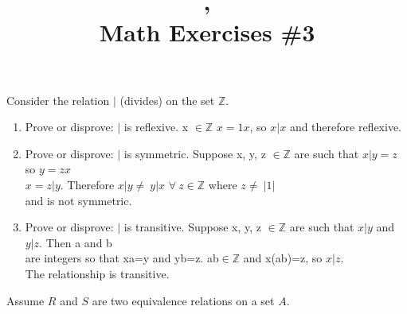 \documentclass{article}
\title{\course, \term\\Math Exercises \#3}
\begin{document}
\maketitle

\question%
%
Consider the relation $|$ (divides) on the set $\mathbb{Z}$.

\begin{enumerate}
\item Prove or disprove: $|$ is reflexive.
\answer \forall x $\in\mathbb{Z}$ $x=1x$, so $x|x$ and therefore reflexive.
\item Prove or disprove: $|$ is symmetric.
\answer Suppose x, y, z $\in\mathbb{Z}$ are such that $x|y=z$ so $y=zx$\\
$x=z|y$. Therefore $x|y\neq\ y|x$ $\forall\ z\in\mathbb{Z}$ where $z\neq\ |1|$\\
and is not symmetric.
\item Prove or disprove: $|$ is transitive.
\answer Suppose x, y, z $\in\mathbb{Z}$ are such that $x|y$ and $y|z$. Then a and b\\
are integers so that xa=y and yb=z. ab$\in\mathbb{Z}$ and x(ab)=z, so $x|z$.\\
The relationship is transitive.
\end{enumerate}

\question%
%
Assume $R$ and $S$ are two equivalence relations on a set $A$.
\end{document}
